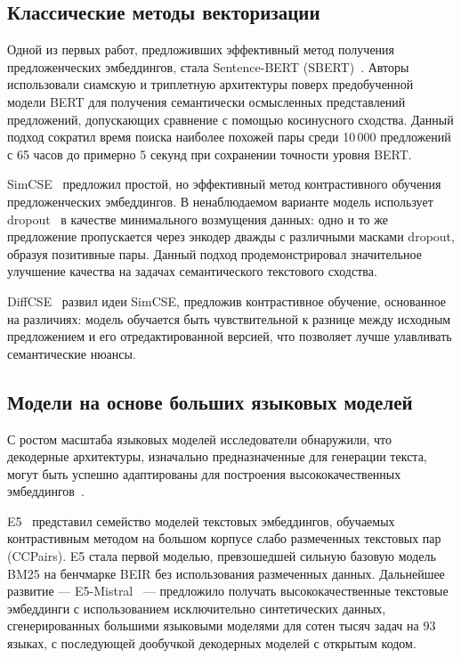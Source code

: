 \subsection{Классические методы векторизации}\label{subsec:classic_embeddings}

Одной из первых работ, предложивших эффективный метод получения предложенческих эмбеддингов, стала Sentence-BERT (SBERT)~\cite{1908.10084}. Авторы использовали сиамскую и триплетную архитектуры поверх предобученной модели BERT для получения семантически осмысленных представлений предложений, допускающих сравнение с помощью косинусного сходства. Данный подход сократил время поиска наиболее похожей пары среди 10\,000 предложений с 65 часов до примерно 5 секунд при сохранении точности уровня BERT.

SimCSE~\cite{2104.08821} предложил простой, но эффективный метод контрастивного обучения предложенческих эмбеддингов. В ненаблюдаемом варианте модель использует dropout~\cite{srivastava2014dropout} в качестве минимального возмущения данных: одно и то же предложение пропускается через энкодер дважды с различными масками dropout, образуя позитивные пары. Данный подход продемонстрировал значительное улучшение качества на задачах семантического текстового сходства.

DiffCSE~\cite{2204.10298} развил идеи SimCSE, предложив контрастивное обучение, основанное на различиях: модель обучается быть чувствительной к разнице между исходным предложением и его отредактированной версией, что позволяет лучше улавливать семантические нюансы.

\subsection{Модели на основе больших языковых моделей}\label{subsec:llm_embeddings}

С ростом масштаба языковых моделей исследователи обнаружили, что декодерные архитектуры, изначально предназначенные для генерации текста, могут быть успешно адаптированы для построения высококачественных эмбеддингов~\cite{2401.00368,2405.17428}.

E5~\cite{2212.03533} представил семейство моделей текстовых эмбеддингов, обучаемых контрастивным методом на большом корпусе слабо размеченных текстовых пар (CCPairs). E5 стала первой моделью, превзошедшей сильную базовую модель BM25 на бенчмарке BEIR без использования размеченных данных. Дальнейшее развитие --- E5-Mistral~\cite{2401.00368} --- предложило получать высококачественные текстовые эмбеддинги с использованием исключительно синтетических данных, сгенерированных большими языковыми моделями для сотен тысяч задач на 93 языках, с последующей дообучкой декодерных моделей с открытым кодом.

